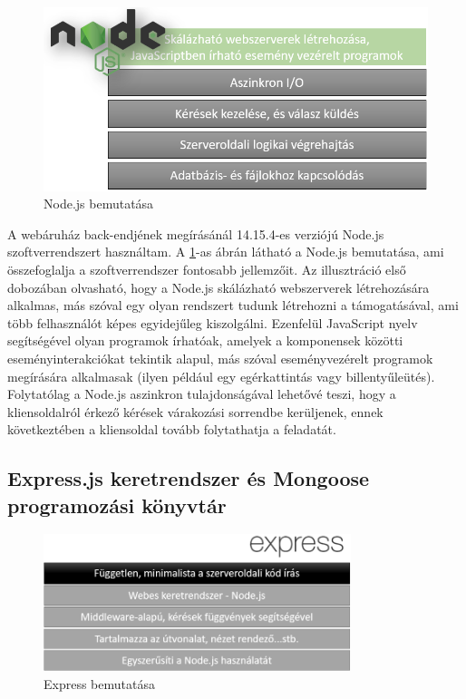 \begin{figure}[H]
	\centering
	\includegraphics[width=1.0\textwidth]{images/nodejs_bemutatasa.png}
	\caption{Node.js bemutatása}
	\label{fig.picture-3}
\end{figure}

A webáruház back-endjének megírásánál 14.15.4-es verziójú Node.js szoftverrendszert használtam. A \ref{fig.picture-3}-as ábrán látható a Node.js bemutatása, ami összefoglalja a szoftverrendszer fontosabb jellemzőit. Az illusztráció első dobozában olvasható, hogy a Node.js skálázható webszerverek létrehozására alkalmas, más szóval egy olyan rendszert tudunk létrehozni a támogatásával, ami több felhasználót képes egyidejűleg kiszolgálni. Ezenfelül JavaScript nyelv segítségével olyan programok írhatóak, amelyek a komponensek közötti eseményinterakciókat tekintik alapul, más szóval eseményvezérelt programok megírására alkalmasak (ilyen például egy egérkattintás vagy billentyűleütés). Folytatólag a Node.js aszinkron tulajdonságával lehetővé teszi, hogy a kliensoldalról érkező kérések várakozási sorrendbe kerüljenek, ennek következtében a kliensoldal tovább folytathatja a feladatát. 

\subsection{Express.js keretrendszer és Mongoose programozási könyvtár}

\begin{figure}[H]
	\centering
	\includegraphics[width=0.8\textwidth]{images/express_bemutatasa.png}
	\caption{Express bemutatása}
	\label{fig.picture-4}
\end{figure}

